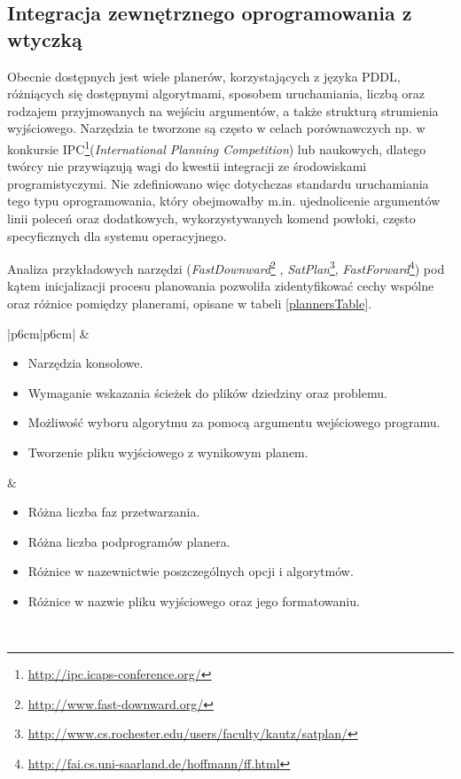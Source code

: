 \subsection{Integracja zewnętrznego oprogramowania z wtyczką}
\label{subsec:integracja}
Obecnie dostępnych jest wiele planerów, korzystających z języka PDDL, różniących się dostępnymi algorytmami, sposobem uruchamiania, liczbą oraz rodzajem przyjmowanych na wejściu argumentów, a także strukturą strumienia wyjściowego. Narzędzia te tworzone są często w celach porównawczych np. w konkursie IPC\footnote{\url{http://ipc.icaps-conference.org/}}(\emph{International Planning Competition}) lub naukowych, dlatego twórcy nie przywiązują wagi do kwestii integracji ze środowiskami programistyczymi. Nie zdefiniowano więc dotychczas standardu uruchamiania tego typu oprogramowania, który obejmowałby m.in. ujednolicenie argumentów linii poleceń oraz dodatkowych, wykorzystywanych komend powłoki, często specyficznych dla systemu operacyjnego.

Analiza przykładowych narzędzi (\emph{FastDownward}\footnote{\url{http://www.fast-downward.org/}} , \emph{SatPlan}\footnote{\url{http://www.cs.rochester.edu/users/faculty/kautz/satplan/}}, \emph{FastForward}\footnote{\url{http://fai.cs.uni-saarland.de/hoffmann/ff.html}}) pod kątem inicjalizacji procesu planowania pozwoliła zidentyfikować cechy wspólne oraz różnice pomiędzy planerami, opisane w tabeli \ref{plannersTable}.
\begin{table}[h]
\centering
\caption{Cechy wspólne oraz różnice w uruchamianiu pomiędzy przykładowymi planerami.}
\label{plannersTable}
\begin{tabular}{|p{6cm}|p{6cm}|}
\hline
{} 
    &  
   \\
   \hline
\begin{itemize}
\item Narzędzia konsolowe.
\item Wymaganie wskazania ścieżek do plików dziedziny oraz problemu.
\item Możliwość wyboru algorytmu za pomocą argumentu wejściowego programu.
\item Tworzenie pliku wyjściowego z wynikowym planem.
\end{itemize}
&
\begin{itemize}
\item Różna liczba faz przetwarzania.
\item Różna liczba podprogramów planera.
\item Różnice w nazewnictwie poszczególnych opcji i algorytmów.
\item Różnice w nazwie pliku wyjściowego oraz jego formatowaniu.
\end{itemize} \\
\hline
\end{tabular}
\end{table}

